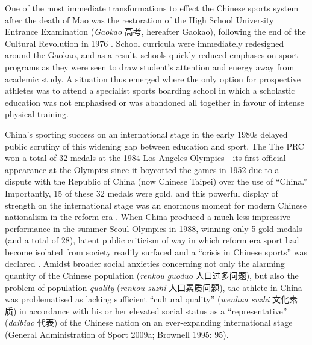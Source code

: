 {One of the most immediate transformations to effect the Chinese sports system after the death of Mao was the restoration of the High School University Entrance Examination (\textit{Gaokao} 高考, hereafter Gaokao), following the end of the Cultural Revolution in 1976 \citep[198]{Brownell1995}.  School curricula were immediately redesigned around the Gaokao, and as a result, schools quickly reduced emphases on sport programs as they were seen to draw student’s attention and energy away from academic study.  A situation thus emerged where the only option for prospective athletes was to attend a specialist sports boarding school in which a scholastic education was not emphasised or was abandoned all together in favour of intense physical training.

China's sporting success on an international stage in the early 1980s delayed public scrutiny of this widening gap between education and sport. The The PRC won a total of 32 medals at the 1984 Los Angeles Olympics---its first official appearance at the Olympics since it boycotted the games in 1952 due to a dispute with the Republic of China (now Chinese Taipei) over the use of ``China.''  Importantly, 15 of these 32 medals were gold, and this powerful display of strength on the international stage was an enormous moment for modern Chinese nationalism in the reform era \citep{Brownell2008}.  When China produced a much less impressive performance in the summer Seoul Olympics in 1988, winning only 5 gold medals (and a total of 28), latent public criticism of way in which reform era sport had become isolated from society readily surfaced and a ``crisis in Chinese sports'' was declared \citep[199]{Brownell1995}.  Amidst broader social anxieties concerning not only the alarming quantity of the Chinese population (\textit{renkou guoduo} 人口过多问题), but also the problem of population \textit{quality} (\textit{renkou suzhi} 人口素质问题), the athlete in China was problematised as lacking sufficient ``cultural quality'' (\textit{wenhua suzhi} 文化素质) in accordance with his or her elevated social status as a ``representative'' (\textit{daibiao} 代表) of the Chinese nation on an ever-expanding international stage (General Administration of Sport 2009a; Brownell 1995: 95).

}
